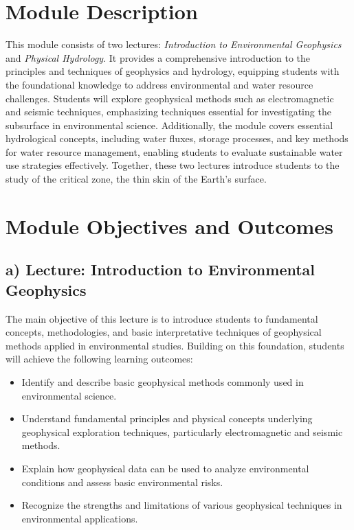 \documentclass[
  letterpaper,
  10pt,
  openany]{book}
\providecommand{\tightlist}{%
  \setlength{\itemsep}{0pt}\setlength{\parskip}{0pt}}\usepackage{longtable,booktabs,array}
\begin{document}
\section*{Module Description}\label{module-description}


This module consists of two lectures: \emph{Introduction to
Environmental Geophysics} and \emph{Physical Hydrology}. It provides a
comprehensive introduction to the principles and techniques of
geophysics and hydrology, equipping students with the foundational
knowledge to address environmental and water resource challenges.
Students will explore geophysical methods such as electromagnetic and
seismic techniques, emphasizing techniques essential for investigating
the subsurface in environmental science. Additionally, the module covers
essential hydrological concepts, including water fluxes, storage
processes, and key methods for water resource management, enabling
students to evaluate sustainable water use strategies effectively.
Together, these two lectures introduce students to the study of the
critical zone, the thin skin of the Earth's surface.

\section*{Module Objectives and
Outcomes}\label{module-objectives-and-outcomes}


\subsection*{a) Lecture: Introduction to Environmental
Geophysics}\label{a-lecture-introduction-to-environmental-geophysics}

The main objective of this lecture is to introduce students to
fundamental concepts, methodologies, and basic interpretative techniques
of geophysical methods applied in environmental studies. Building on
this foundation, students will achieve the following learning outcomes:

\begin{itemize}
\tightlist
\item
  Identify and describe basic geophysical methods commonly used in
  environmental science.
\item
  Understand fundamental principles and physical concepts underlying
  geophysical exploration techniques, particularly electromagnetic and
  seismic methods.
\item
  Explain how geophysical data can be used to analyze environmental
  conditions and assess basic environmental risks.
\item
  Recognize the strengths and limitations of various geophysical
  techniques in environmental applications.
\end{itemize}
\end{document}
